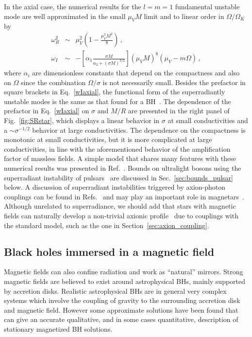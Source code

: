 \documentclass[11pt]{article}
\numberwithin{equation}{section} %
\begin{document}
In the axial case, the numerical results for the $l=m=1$ fundamental unstable mode are well approximated in the small 
$\mu_VM$ limit and to linear order in $\Omega/\Omega_K$ by~\cite{Cardoso:2017kgn}
%
\begin{eqnarray}
%
\omega_R^2&\sim&\mu_V^2\left(1-\frac{\mu_V^2M^2}{8}\right)\,,\\
%
\omega_I&\sim&-\left[\alpha_1\frac{\sigma M}{\alpha_2+(\sigma M)^{3/2}}\right](\mu_VM)^8 (\mu_V-m\Omega)\,, 
\label{wIaxial}
\end{eqnarray}
%
where $\alpha_i$ are dimensionless constants that depend on the compactness and also on $\Omega$ since the combination 
$ 
\Omega/\sigma$ is not necessarily small. Besides the prefactor in square brackets in Eq.~\eqref{wIaxial}, the 
functional 
form of the superradiantly unstable modes is the same as that found for a 
BH~\cite{Pani:2012bp,Pani:2012vp,Rosa:2011my,Witek:2012tr}.
%
The dependence of the prefactor in Eq.~\eqref{wIaxial} on $\sigma$ and $M/R$ are presented in the right panel of
Fig.~\ref{fig:SRstar}, which displays a linear behavior in $\sigma$ at small conductivities and a 
$\sim\sigma^{-1/2}$ behavior at large conductivities. The dependence on the compactness is monotonic at 
small conductivities, but it is more complicated at large conductivities, in line with the aforementioned behavior of 
the amplification factor of massless fields.
%
%
A simple model that shares many features with these numerical results was presented in Ref.~\cite{Cardoso:2017kgn}.
%
Bounds on ultralight bosons using the superradiant instability of pulsars~\cite{Cardoso:2017kgn,Kaplan:2019ako} are 
discussed in Sec.~\ref{sec:bounds_pulsar} below. A discussion of superradiant instabilities triggered by axion-photon couplings
can be found in Refs.~\cite{Boskovic:2018lkj,Day:2019bbh} and may play an important role in magnetars~\cite{Day:2019bbh}. Although unrelated to superradiance, we should add that stars with magnetic fields
can naturally develop a non-trivial axionic profile~\cite{Garbrecht:2018akc} due to couplings with the standard model, such as the one in Section~\ref{sec:axion_coupling}.





\subsection{Black holes immersed in a magnetic field}\label{sec:magnetic}
Magnetic fields can also confine radiation and work as ``natural'' mirrors. Strong magnetic fields are believed to exist around astrophysical BHs, mainly supported by accretion disks. Realistic astrophysical BHs are in general very complex systems which involve the coupling of gravity to the surrounding accretion disk and magnetic field. However some approximate solutions have been found that can give an accurate qualitative, and in some cases quantitative, description of stationary magnetized BH solutions. 
\end{document}
